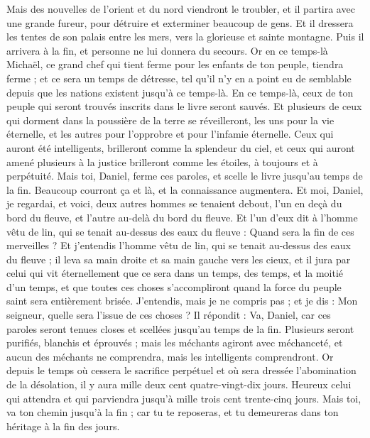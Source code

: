 \begin{multicols}{2}
Mais des nouvelles de l'orient et du nord viendront le troubler, et il partira avec une grande fureur, pour détruire et exterminer beaucoup de gens.
Et il dressera les tentes de son palais entre les mers, vers la glorieuse et sainte montagne. Puis il arrivera à la fin, et personne ne lui donnera du secours.
\VerseOne{}Or en ce temps-là Michaël, ce grand chef qui tient ferme pour les enfants de ton peuple, tiendra ferme ; et ce sera un temps de détresse, tel qu'il n'y en a point eu de semblable depuis que les nations existent jusqu'à ce temps-là. En ce temps-là, ceux de ton peuple qui seront trouvés inscrits dans le livre seront sauvés.
Et plusieurs de ceux qui dorment dans la poussière de la terre se réveilleront, les uns pour la vie éternelle, et les autres pour l'opprobre et pour l'infamie éternelle.
Ceux qui auront été intelligents, brilleront comme la splendeur du ciel, et ceux qui auront amené plusieurs à la justice brilleront comme les étoiles, à toujours et à perpétuité.
Mais toi, Daniel, ferme ces paroles, et scelle le livre jusqu'au temps de la fin. Beaucoup courront ça et là, et la connaissance augmentera.
Et moi, Daniel, je regardai, et voici, deux autres hommes se tenaient debout, l'un en deçà du bord du fleuve, et l'autre au-delà du bord du fleuve.
Et l'un d'eux dit à l'homme vêtu de lin, qui se tenait au-dessus des eaux du fleuve : Quand sera la fin de ces merveilles ?
Et j'entendis l'homme vêtu de lin, qui se tenait au-dessus des eaux du fleuve ; il leva sa main droite et sa main gauche vers les cieux, et il jura par celui qui vit éternellement que ce sera dans un temps, des temps, et la moitié d'un temps, et que toutes ces choses s'accompliront quand la force du peuple saint sera entièrement brisée.
J'entendis, mais je ne compris pas ; et je dis : Mon seigneur, quelle sera l'issue de ces choses ?
Il répondit : Va, Daniel, car ces paroles seront tenues closes et scellées jusqu'au temps de la fin.
Plusieurs seront purifiés, blanchis et éprouvés ; mais les méchants agiront avec méchanceté, et aucun des méchants ne comprendra, mais les intelligents comprendront.
Or depuis le temps où cessera le sacrifice perpétuel et où sera dressée l'abomination de la désolation, il y aura mille deux cent quatre-vingt-dix jours.
Heureux celui qui attendra et qui parviendra jusqu'à mille trois cent trente-cinq jours.
Mais toi, va ton chemin jusqu'à la fin ; car tu te reposeras, et tu demeureras dans ton héritage à la fin des jours.
\PPE{}
\end{multicols}
